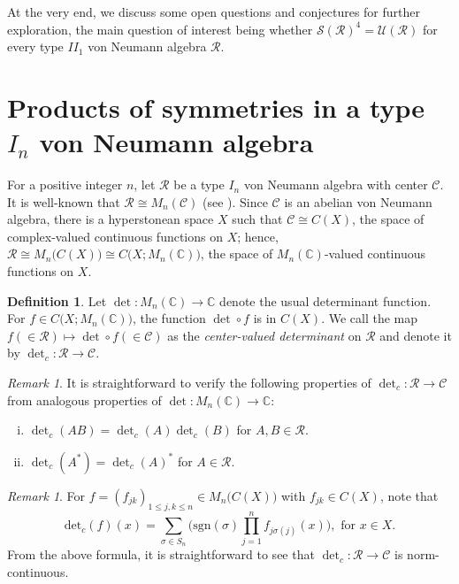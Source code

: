 \documentclass[12pt, preprint]{amsart}
\newcommand{\C}{\mathbb{C}}
\theoremstyle{definition}
\newtheorem{definition}[thm]{Definition}
\theoremstyle{remark}
\newtheorem{remark}[thm]{Remark}
\numberwithin{equation}{section}
\theoremstyle{ser}
\theoremstyle{serr}
\theoremstyle{ser}
\begin{document}
At the very end, we discuss some open questions and conjectures for further exploration, the main question of interest being whether $\mathcal{S}(\mathscr{R})^4 = \mathcal{U}(\mathscr{R})$ for every type $II_1$ von Neumann algebra $\mathscr{R}$.



\section{Products of symmetries in a type $I_n$ von Neumann algebra}

For a positive integer $n$, let $\mathscr{R}$ be a type $I_n$ von Neumann algebra with center $\mathscr{C}$. It is well-known that $\mathscr{R} \cong M_n(\mathscr{C})$ (see \cite[Theorem 6.6.5]{kadison-ringrose2}). Since $\mathscr{C}$ is an abelian von Neumann algebra, there is a hyperstonean space $X$ such that $\mathscr{C} \cong C(X)$, the space of complex-valued continuous functions on $X$; hence, $\mathscr{R} \cong M_n \big( C(X) \big) \cong C \big( X; M_n(\C) \big)$, the space of $M_n(\C)$-valued continuous functions on $X$.

\begin{definition}
\label{def:cv_det}
Let $\det : M_n(\C) \to \C$ denote the usual determinant function. For $f \in C\big( X; M_n(\C) \big)$, the function $\det \circ f$ is in $C(X)$. We call the map $f (\in \mathscr{R}) \mapsto \det \circ f (\in \mathscr{C})$ as the {\it center-valued determinant} on $\mathscr{R}$ and denote it by $\det_c : \mathscr{R} \to \mathscr{C}$.
\end{definition}

\begin{remark}
\label{rmrk:detc}
It is straightforward to verify the following properties of $\det _c : \mathscr{R} \to \mathscr{C}$ from analogous properties of $\det : M_n(\C) \to \C$:
\begin{enumerate}[(i)]
    \item $\det_c(AB) = \det_c (A)  \det_c (B)$ for $A, B  \in \mathscr{R}$.
    \item $\det _c(A^*) = \det_c(A)^*$ for $A \in \mathscr{R}$.
\end{enumerate}
\end{remark}

\begin{remark}
\label{rmrk:detc_cont}
For $f = (f_{jk})_{1 \le j, k \le n} \in M_n \big( C(X) \big)$ with $f_{jk} \in C(X)$, note that
$$\mathrm{det}_c(f)(x) = \sum_{\sigma \in S_n} \Big( \mathrm{sgn}(\sigma) \prod_{j = 1}^n f_{j \sigma(j)}(x) \Big), \textrm{ for } x \in X.$$
From the above formula, it is straightforward to see that $\det _c : \mathscr{R} \to \mathscr{C}$ is norm-continuous.
\end{remark}
\end{document}
